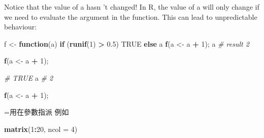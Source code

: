 \documentclass[]{book}
\newenvironment{Shaded}{\begin{snugshade}}{\end{snugshade}}
\newcommand{\CommentTok}[1]{\textcolor[rgb]{0.56,0.35,0.01}{\textit{#1}}}
\newcommand{\ControlFlowTok}[1]{\textcolor[rgb]{0.13,0.29,0.53}{\textbf{#1}}}
\newcommand{\DataTypeTok}[1]{\textcolor[rgb]{0.13,0.29,0.53}{#1}}
\newcommand{\DecValTok}[1]{\textcolor[rgb]{0.00,0.00,0.81}{#1}}
\newcommand{\FloatTok}[1]{\textcolor[rgb]{0.00,0.00,0.81}{#1}}
\newcommand{\KeywordTok}[1]{\textcolor[rgb]{0.13,0.29,0.53}{\textbf{#1}}}
\newcommand{\NormalTok}[1]{#1}
\newcommand{\OperatorTok}[1]{\textcolor[rgb]{0.81,0.36,0.00}{\textbf{#1}}}
\newcommand{\OtherTok}[1]{\textcolor[rgb]{0.56,0.35,0.01}{#1}}
\newcommand{\StringTok}[1]{\textcolor[rgb]{0.31,0.60,0.02}{#1}}
\theoremstyle{definition}
\theoremstyle{definition}
\theoremstyle{definition}
\theoremstyle{remark}
\begin{document}
Notice that the value of a hasn 't changed! In R, the value of a will
only change if we need to evaluate the argument in the function. This
can lead to unpredictable behaviour:

\begin{Shaded}
\begin{Highlighting}[]
\NormalTok{f <-}\StringTok{ }\ControlFlowTok{function}\NormalTok{(a) }\ControlFlowTok{if}\NormalTok{ (}\KeywordTok{runif}\NormalTok{(}\DecValTok{1}\NormalTok{) }\OperatorTok{>}\StringTok{ }\FloatTok{0.5}\NormalTok{) }\OtherTok{TRUE} \ControlFlowTok{else}\NormalTok{ a}
    \KeywordTok{f}\NormalTok{(a <-}\StringTok{ }\NormalTok{a }\OperatorTok{+}\StringTok{ }\DecValTok{1}\NormalTok{);}
\NormalTok{a }\CommentTok{# result 2}
\end{Highlighting}
\end{Shaded}

\begin{Shaded}
\begin{Highlighting}[]
\KeywordTok{f}\NormalTok{(a <-}\StringTok{ }\NormalTok{a }\OperatorTok{+}\StringTok{ }\DecValTok{1}\NormalTok{);}
\end{Highlighting}
\end{Shaded}

\begin{Shaded}
\begin{Highlighting}[]
\CommentTok{# TRUE}
\NormalTok{a }\CommentTok{# 2}
\end{Highlighting}
\end{Shaded}

\begin{Shaded}
\begin{Highlighting}[]
\KeywordTok{f}\NormalTok{(a <-}\StringTok{ }\NormalTok{a }\OperatorTok{+}\StringTok{ }\DecValTok{1}\NormalTok{);}
\end{Highlighting}
\end{Shaded}

\begin{Shaded}
\end{Shaded}

=用在參數指派 例如

\begin{Shaded}
\begin{Highlighting}[]
\KeywordTok{matrix}\NormalTok{(}\DecValTok{1}\OperatorTok{:}\DecValTok{20}\NormalTok{, }\DataTypeTok{ncol =} \DecValTok{4}\NormalTok{)}
\end{Highlighting}
\end{Shaded}
\end{document}

